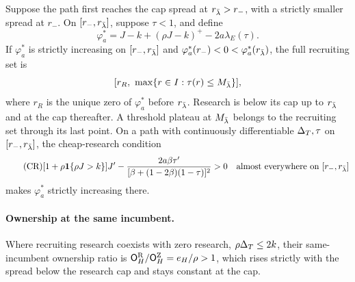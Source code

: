 \begin{proposition}
\begin{enumerate}[label=(\alph*),leftmargin=2em]
Suppose the path first reaches the cap spread at \(r_{\bar\lambda}>r_-\), with a strictly smaller spread at \(r_-\).
On \([r_-,r_{\bar\lambda}]\), suppose \(\tau<1\), and define
\[
 \varphi_a^*=J-k+(\rho J-k)^+-2a\lambda_E(\tau).
\]
If \(\varphi_a^*\) is strictly increasing on \([r_-,r_{\bar\lambda}]\) and
\(\varphi_a^*(r_-)<0<\varphi_a^*(r_{\bar\lambda})\), the full recruiting set is
\[
 [r_R,\ \max\{r\in I:\tau(r)\le M_{\lb}\}],
\]
where \(r_R\) is the unique zero of \(\varphi_a^*\) before \(r_{\bar\lambda}\).
Research is below its cap up to \(r_{\bar\lambda}\) and at the cap thereafter. A threshold plateau at \(M_{\bar\lambda}\) belongs
to the recruiting set through its last point.
On a path with continuously differentiable \(\Delta_T,\tau\) on \([r_-,r_{\bar\lambda}]\), the cheap-research condition
\begin{equation}\tag{CR}\label{eq:a5-cheap}
 [1+\rho\mathbf{1}\{\rho J>k\}]J'
 -\frac{2a\beta\tau'}{[\beta+(1-2\beta)(1-\tau)]^2}>0
 \quad\text{almost everywhere on }[r_-,r_{\bar\lambda}]
\end{equation}
makes \(\varphi_a^*\) strictly increasing there.
\end{enumerate}
\end{proposition}

\paragraph{Ownership at the same incumbent.}
Where recruiting research coexists with zero research, \(\rho\Delta_T\le2k\), their same-incumbent ownership ratio is
\(\mathsf{O}_H^{\rm R}/\mathsf{O}_H^{\rm Z}=e_H/\rho>1\), which rises strictly with the spread below the research cap and
stays constant at the cap.


